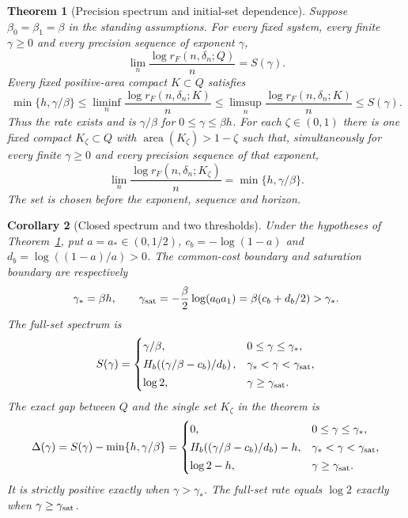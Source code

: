 \documentclass[11pt]{amsart}
\newtheorem{theorem}{Theorem}[section]
\newtheorem{corollary}[theorem]{Corollary}
\theoremstyle{definition}
\theoremstyle{remark}
\newcommand{\area}{\operatorname{area}}
\numberwithin{equation}{section}
\begin{document}
\begin{theorem}[Precision spectrum and initial-set dependence]\label{thm:main}
Suppose $\beta_0=\beta_1=\beta$ in the standing assumptions.
For every fixed system,
every finite $\gamma\ge0$ and every precision sequence of exponent
$\gamma$,
\begin{equation}\label{eq:spectrum}
\lim_n\frac{\log r_F(n,\delta_n;Q)}n=S(\gamma).
\end{equation}
Every fixed positive-area compact $K\subset Q$ satisfies
\begin{equation}\label{eq:universal}
\min\{h,\gamma/\beta\}\le
\liminf_n\frac{\log r_F(n,\delta_n;K)}n\le
\limsup_n\frac{\log r_F(n,\delta_n;K)}n\le
S(\gamma).
\end{equation}
Thus the rate exists and is $\gamma/\beta$ for $0\le\gamma\le\beta h$.
For each $\zeta\in(0,1)$ there is one fixed compact
$K_\zeta\subset Q$ with $\area(K_\zeta)>1-\zeta$ such that,
simultaneously for every finite $\gamma\ge0$ and every precision
sequence of that exponent,
\begin{equation}\label{eq:high}
\lim_n\frac{\log r_F(n,\delta_n;K_\zeta)}n
                         =\min\{h,\gamma/\beta\}.
\end{equation}
The set is chosen before the exponent, sequence and horizon.
\end{theorem}

\begin{corollary}[Closed spectrum and two thresholds]\label{cor:thresholds}
Under the hypotheses of Theorem~\ref{thm:main}, put
$a=a_*\in(0,1/2)$,
$c_b=-\log(1-a)$ and $d_b=\log((1-a)/a)>0$.
The common-cost boundary and saturation boundary are respectively
\begin{equation}\label{eq:thresholds}
\gamma_*=\beta h,\qquad
\gamma_{\rm sat}=-\frac\beta2\log(a_0a_1)
                  =\beta(c_b+d_b/2)>\gamma_*.
\end{equation}
The full-set spectrum is
\begin{equation}\label{eq:closed}
S(\gamma)=
\begin{cases}
\gamma/\beta,&0\le\gamma\le\gamma_*,\\[2pt]
H_b\!\left((\gamma/\beta-c_b)/d_b\right),
      &\gamma_*<\gamma<\gamma_{\rm sat},\\[2pt]
\log2,&\gamma\ge\gamma_{\rm sat}.
\end{cases}
\end{equation}
The exact gap between $Q$ and the single set $K_\zeta$ in the theorem is
\begin{equation}\label{eq:gap}
\Delta(\gamma)=S(\gamma)-\min\{h,\gamma/\beta\}=
\begin{cases}
0,&0\le\gamma\le\gamma_*,\\[2pt]
H_b\!\left((\gamma/\beta-c_b)/d_b\right)-h,
      &\gamma_*<\gamma<\gamma_{\rm sat},\\[2pt]
\log2-h,&\gamma\ge\gamma_{\rm sat}.
\end{cases}
\end{equation}
It is strictly positive exactly when $\gamma>\gamma_*$.
The full-set rate equals $\log2$ exactly when
$\gamma\ge\gamma_{\rm sat}$.
\end{corollary}
\end{document}
